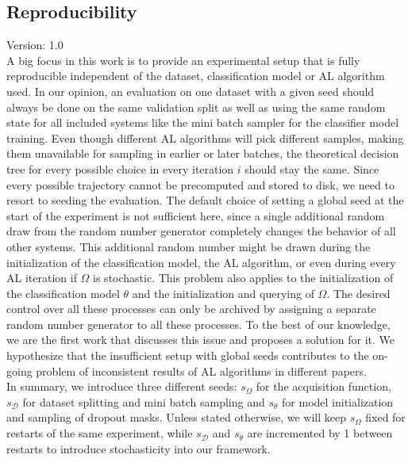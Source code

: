 \documentclass[]{article}
\begin{document}
\subsection{Reproducibility}\label{sec:reproducibility}
{\color{red} Version: 1.0}\\
A big focus in this work is to provide an experimental setup that is fully reproducible independent of the dataset, classification model or AL algorithm used.
In our opinion, an evaluation on one dataset with a given seed should always be done on the same validation split as well as using the same random state for all included systems like the mini batch sampler for the classifier model training.
Even though different AL algorithms will pick different samples, making them unavailable for sampling in earlier or later batches, the theoretical decision tree for every possible choice in every iteration $i$ should stay the same.
Since every possible trajectory cannot be precomputed and stored to disk, we need to resort to seeding the evaluation.
The default choice of setting a global seed at the start of the experiment is not sufficient here, since a single additional random draw from the random number generator completely changes the behavior of all other systems.
This additional random number might be drawn during the initialization of the classification model, the AL algorithm, or even during every AL iteration if $\Omega$ is stochastic.
This problem also applies to the initialization of the classification model $\theta$ and the initialization and querying of $\Omega$.
The desired control over all these processes can only be archived by assigning a separate random number generator to all these processes.
To the best of our knowledge, we are the first work that discusses this issue and proposes a solution for it.
We hypothesize that the insufficient setup with global seeds contributes to the on-going problem of inconsistent results of AL algorithms in different papers. \\ [1mm]
In summary, we introduce three different seeds: $s_\Omega$ for the acquisition function, $s_\mathcal{D}$ for dataset splitting and mini batch sampling and $s_\theta$ for model initialization and sampling of dropout masks.
Unless stated otherwise, we will keep $s_\Omega$ fixed for restarts of the same experiment, while $s_\mathcal{D}$ and $s_\theta$ are incremented by 1 between restarts to introduce stochasticity into our framework.

\end{document}
